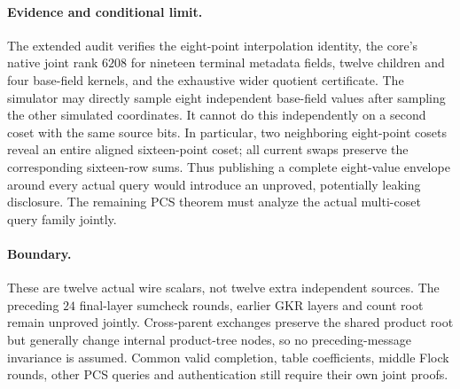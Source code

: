 \paragraph{Evidence and conditional limit.} The extended audit verifies the eight-point interpolation identity, the core's native joint rank $6208$ for nineteen terminal metadata fields, twelve children and four base-field kernels, and the exhaustive wider quotient certificate. The simulator may directly sample eight independent base-field values after sampling the other simulated coordinates. It cannot do this independently on a second coset with the same source bits. In particular, two neighboring eight-point cosets reveal an entire aligned sixteen-point coset; all current swaps preserve the corresponding sixteen-row sums. Thus publishing a complete eight-value envelope around every actual query would introduce an unproved, potentially leaking disclosure. The remaining PCS theorem must analyze the actual multi-coset query family jointly.

\paragraph{Boundary.} These are twelve actual wire scalars, not twelve extra independent sources. The preceding $24$ final-layer sumcheck rounds, earlier GKR layers and count root remain unproved jointly. Cross-parent exchanges preserve the shared product root but generally change internal product-tree nodes, so no preceding-message invariance is assumed. Common valid completion, table coefficients, middle Flock rounds, other PCS queries and authentication still require their own joint proofs.
